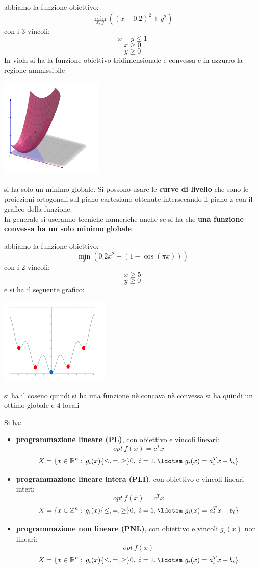 \documentclass[a4paper,12pt, oneside]{book}
\begin{document}
\newpage
\begin{esempio}
  abbiamo la funzione obiettivo:
  \[\min_{x,y}((x-0.2)^2+y^2)\]
  con i 3 vincoli:
  \[x+y \leq 1\]
  \[x\geq 0\]
  \[y\geq 0\]
  In viola si ha la funzione obiettivo tridimensionale e convessa
  e in azzurro la regione ammissibile
  \begin{center}
    \includegraphics[scale = 1.3]{img/optes.png}
  \end{center}
  si ha solo un minimo globale.
  Si possono usare le \textbf{curve di livello} che sono le proiezioni
  ortogonali sul piano cartesiano ottenute intersecando il piano z con
  il grafico della funzione.\\
  In generale si useranno tecniche numeriche anche se si ha che
  \textbf{una funzione convessa ha un solo minimo globale}
\end{esempio}
\newpage
\begin{esempio}
  abbiamo la funzione obiettivo:
  \[\min_{x}(0.2x^2+(1-\cos(\pi x)))\]
  con i 2 vincoli:
  \[x\geq 5\]
  \[y\geq 0\]
  e si ha il seguente grafico:
  \begin{center}
    \includegraphics[scale = 1.3]{img/optes2.png}
  \end{center}
  si ha il coseno quindi si ha una funzione nè concava nè convessa
  si ha quindi un ottimo globale e 4 locali
\end{esempio}
Si ha:
\begin{itemize}
  \item \textbf{programmazione lineare (PL)}, con obiettivo e vincoli
  lineari:
  \[opt\,f(x)=c^T x\]
  \[X=\{x\in\mathbb{R}^n:\, g_i(x)\{\leq, =, \geq\}0,\,\,
    i=1,\ldotsm\,\, g_i(x)=a_i^T x-b_i\}\]
  \item \textbf{programmazione lineare intera (PLI)}, con obiettivo e
  vincoli lineari interi:
  \[opt\,f(x)=c^T x\]
  \[X=\{x\in\mathbb{Z}^n:\, g_i(x)\{\leq, =, \geq\}0,\,\,
    i=1,\ldotsm\,\, g_i(x)=a_i^T x-b_i\}\]
  \item \textbf{programmazione non lineare (PNL)}, con obiettivo e
  vincoli $g_i(x)$ non lineari:
  \[opt\,f(x)\]
  \[X=\{x\in\mathbb{R}^n:\, g_i(x)\{\leq, =, \geq\}0,\,\,
    i=1,\ldotsm\,\, g_i(x)=a_i^T x-b_i\}\]
\end{itemize}
\end{document}
